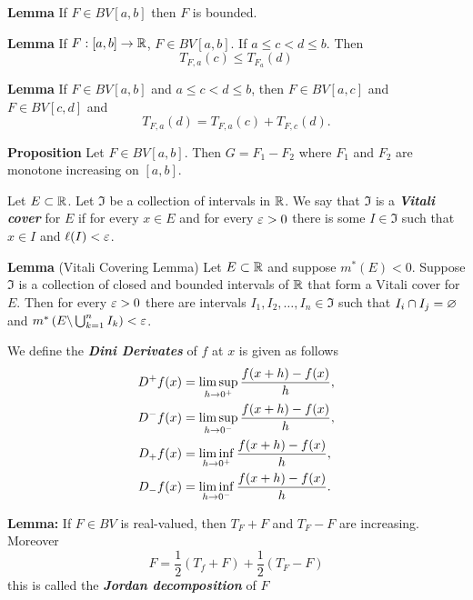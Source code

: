 \vs

\textbf{Lemma} If $F\in BV[a,b]$ then $F$ is bounded.

\vs

\textbf{Lemma} If $F:[a,b]\rightarrow \mathbb{R}$, $F\in BV[a,b]$. If $a \leq c < d \leq b$. Then 
\[T_{F, a}(c) \leq T_{F_a}(d)\]

\vs

\textbf{Lemma} If $F\in BV[a,b]$ and $a\leq c < d \leq b$, then $F\in BV[a,c]$ and $F\in BV[c,d]$ and
\[T_{F, a}(d) = T_{F, a}(c) + T_{F, c}(d).\]

\vs

\textbf{Proposition} Let $F\in BV[a,b]$. Then $G = F_1 - F_2$ where $F_1$ and $F_2$ are monotone increasing on $[a,b]$.


\vs

\dfn Let $E\subset \mathbb{R}$. Let $\mathfrak{I}$ be a collection of intervals in $\mathbb{R}$. We say that $\mathfrak{I}$ is a \textbf{\textit{Vitali cover}} for $E$ if for every $x\in E$ and for every $\varepsilon > 0$ there is some $I\in \mathfrak{I}$ such that $x\in I$ and $\ell(I) < \varepsilon$.

\vs

\textbf{Lemma} (Vitali Covering Lemma) Let $E\subset \mathbb{R}$ and suppose $m^*(E) < 0$. Suppose $\mathfrak{I}$ is a collection of closed and bounded intervals of $\mathbb{R}$ that form a Vitali cover for $E$. Then for every $\varepsilon > 0$ there are intervals $I_1, I_2, \ldots, I_n \in \mathfrak{I}$ such that $I_i\cap I_j = \varnothing$ and $m^*\left( E\backslash \bigcup_{k = 1}^n I_k \right) < \varepsilon$.

\vs

\dfn We define the \textbf{\textit{Dini Derivates}} of $f$ at $x$ is given as follows
\begin{align*}
    D^+f(x) &= \limsup_{h \rightarrow 0^+} \frac{f(x + h) - f(x)}{h},\\
    D^-f(x) &= \limsup_{h \rightarrow 0^-} \frac{f(x + h) - f(x)}{h},\\
    D_+f(x) &= \liminf_{h \rightarrow 0^+} \frac{f(x + h) - f(x)}{h},\\
    D_-f(x) &= \liminf_{h \rightarrow 0^-} \frac{f(x + h) - f(x)}{h}.
\end{align*}


\vs

\textbf{Lemma:} If $F\in BV$ is real-valued, then $T_F + F$ and $T_F - F$ are increasing. Moreover
\[F = \frac{1}{2}(T_f + F) + \frac{1}{2}(T_F - F)\]
this is called the \textbf{\textit{Jordan decomposition}} of $F$

\vs

